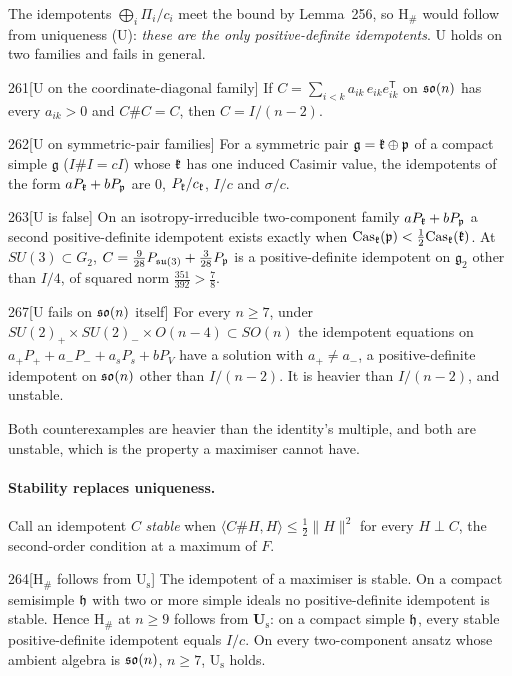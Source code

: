 The idempotents $\bigoplus_i\Pi_i/c_i$ meet the bound by Lemma~256, so H$_\#$ would follow from uniqueness (U): \emph{these are the only positive-definite idempotents}. U holds on two families and fails in general.

\begin{Lem}{261}[U on the coordinate-diagonal family]
If $C=\sum_{i<k}a_{ik}\,e_{ik}e_{ik}^{\mathsf T}$ on $\mathfrak{so}(n)$ has every $a_{ik}>0$ and $C\#C=C$, then $C=I/(n-2)$.
\end{Lem}

\begin{Lem}{262}[U on symmetric-pair families]
For a symmetric pair $\mathfrak g=\mathfrak{k}\oplus\mathfrak{p}$ of a compact simple $\mathfrak g$ ($I\#I=cI$) whose $\mathfrak{k}$ has one induced Casimir value, the idempotents of the form $aP_{\mathfrak{k}}+bP_{\mathfrak{p}}$ are $0$, $P_{\mathfrak{k}}/c_{\mathfrak{k}}$, $I/c$ and $\sigma/c$.
\end{Lem}

\begin{Lem}{263}[U is false]
On an isotropy-irreducible two-component family $aP_{\mathfrak{k}}+bP_{\mathfrak{p}}$ a second positive-definite idempotent exists exactly when $\mathrm{Cas}_{\mathfrak{k}}(\mathfrak{p})<\tfrac12\mathrm{Cas}_{\mathfrak{k}}(\mathfrak{k})$. At $SU(3)\subset G_2$, $C=\tfrac9{28}P_{\mathfrak{su}(3)}+\tfrac3{28}P_{\mathfrak{p}}$ is a positive-definite idempotent on $\mathfrak g_2$ other than $I/4$, of squared norm $\tfrac{351}{392}>\tfrac78$.
\end{Lem}

\begin{Lem}{267}[U fails on $\mathfrak{so}(n)$ itself]
For every $n\ge7$, under $SU(2)_+\times SU(2)_-\times O(n-4)\subset SO(n)$ the idempotent equations on $a_+P_++a_-P_-+a_sP_s+bP_V$ have a solution with $a_+\ne a_-$, a positive-definite idempotent on $\mathfrak{so}(n)$ other than $I/(n-2)$. It is heavier than $I/(n-2)$, and unstable.
\end{Lem}

Both counterexamples are heavier than the identity's multiple, and both are unstable, which is the property a maximiser cannot have.

\paragraph{Stability replaces uniqueness.} Call an idempotent $C$ \emph{stable} when $\langle C\#H,H\rangle\le\tfrac12\lVert H\rVert^2$ for every $H\perp C$, the second-order condition at a maximum of $F$.

\begin{Lem}{264}[H$_\#$ follows from U$_{\mathrm s}$]
The idempotent of a maximiser is stable. On a compact semisimple $\mathfrak{h}$ with two or more simple ideals no positive-definite idempotent is stable. Hence H$_\#$ at $n\ge9$ follows from \textbf{U$_{\mathrm s}$}: on a compact simple $\mathfrak{h}$, every stable positive-definite idempotent equals $I/c$. On every two-component ansatz whose ambient algebra is $\mathfrak{so}(n)$, $n\ge7$, U$_{\mathrm s}$ holds.
\end{Lem}

